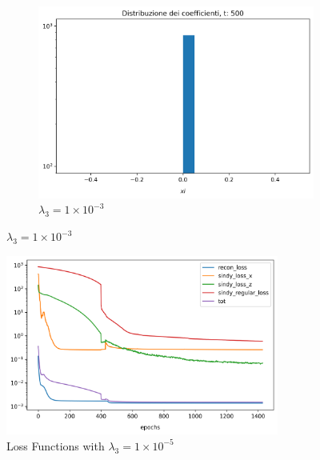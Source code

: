 \documentclass[11pt]{article}
\begin{document}
\begin{figure}
\begin{subfigure}{.3\textwidth}
\end{subfigure}
\begin{subfigure}{.3\textwidth}
    \centering
  \includegraphics[width=1.\textwidth]{img/Xi_distribution_500.png}  
  \caption{$\lambda_3 = 1 \times 10^{-3} $}
\end{subfigure}

\end{figure}


\begin{figure}[h]
\centering
\includegraphics[width=0.8\textwidth]{img/loss.png}
\caption{Loss Functions with $\lambda_3 = 1 \times 10^{-5} $}
\end{figure}
\end{document}
